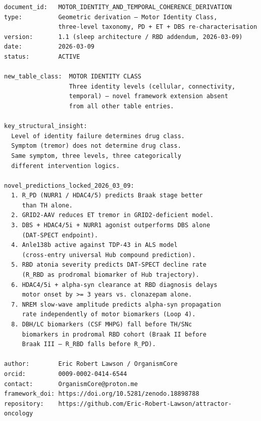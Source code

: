 \documentclass[12pt,a4paper]{article}
\begin{document}
\begin{small}
\begin{verbatim}
document_id:   MOTOR_IDENTITY_AND_TEMPORAL_COHERENCE_DERIVATION
type:          Geometric derivation — Motor Identity Class,
               three-level taxonomy, PD + ET + DBS re-characterisation
version:       1.1 (sleep architecture / RBD addendum, 2026-03-09)
date:          2026-03-09
status:        ACTIVE

new_table_class:  MOTOR IDENTITY CLASS
                  Three identity levels (cellular, connectivity,
                  temporal) — novel framework extension absent
                  from all other table entries.

key_structural_insight:
  Level of identity failure determines drug class.
  Symptom (tremor) does not determine drug class.
  Same symptom, three levels, three categorically
  different intervention logics.

novel_predictions_locked_2026_03_09:
  1. R_PD (NURR1 / HDAC4/5) predicts Braak stage better
     than TH alone.
  2. GRID2-AAV reduces ET tremor in GRID2-deficient model.
  3. DBS + HDAC4/5i + NURR1 agonist outperforms DBS alone
     (DAT-SPECT endpoint).
  4. Anle138b active against TDP-43 in ALS model
     (cross-entry universal Hub compound prediction).
  5. RBD atonia severity predicts DAT-SPECT decline rate
     (R_RBD as prodromal biomarker of Hub trajectory).
  6. HDAC4/5i + alpha-syn clearance at RBD diagnosis delays
     motor onset by >= 3 years vs. clonazepam alone.
  7. NREM slow-wave amplitude predicts alpha-syn propagation
     rate independently of motor biomarkers (Loop 4).
  8. DBH/LC biomarkers (CSF MHPG) fall before TH/SNc
     biomarkers in prodromal RBD cohort (Braak II before
     Braak III — R_RBD falls before R_PD).

author:        Eric Robert Lawson / OrganismCore
orcid:         0009-0002-0414-6544
contact:       OrganismCore@proton.me
framework_doi: https://doi.org/10.5281/zenodo.18898788
repository:    https://github.com/Eric-Robert-Lawson/attractor-oncology
\end{verbatim}
\end{small}
\end{document}

